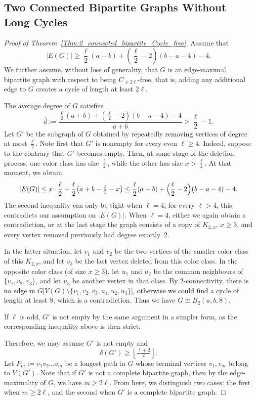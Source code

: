 \documentclass[11pt,a4paper]{article}
\begin{document}
\subsection{Two Connected Bipartite Graphs Without Long Cycles}\label{Sec:Proof}
\begin{proof}[Proof of Theorem~\ref{Thm:2_connected_bipartite_Cycle_free}]
Assume that
\[
|E(G)| \ge \frac{\ell}{2}(a + b) + \left(\frac{\ell}{2} - 2\right)(b - a - 4) - 4.
\]  
We further assume, without loss of generality, that $G$ is an edge-maximal bipartite graph with respect to being $C_{\ge2\ell}$-free, that is, adding any additional edge to $G$ creates a cycle of length at least $2\ell$.

The average degree of $G$ satisfies
\[
\overline{d}
:= \frac{\tfrac{\ell}{2}(a + b)
      + \left(\tfrac{\ell}{2} - 2\right)(b - a - 4) - 4}{a + b}
> \frac{\ell}{2} - 1.
\]
Let $G'$ be the subgraph of $G$ obtained by repeatedly removing vertices
of degree at most $\tfrac{\ell}{2}$.
Note first that $G'$ is nonempty for every even $\ell \ge 4$.
Indeed, suppose to the contrary that $G'$ becomes empty.
Then, at some stage of the deletion process, one color class has size $\tfrac{\ell}{2}$,
while the other has size $x > \tfrac{\ell}{2}$.
At that moment, we obtain
\[
|E(G)|
\le x \cdot \frac{\ell}{2}
   + \frac{\ell}{2}\bigl(a + b - \tfrac{\ell}{2} - x\bigr)
\le \frac{\ell}{2}(a + b)
   + \Bigl(\frac{\ell}{2} - 2\Bigr)(b - a - 4) - 4.
\]
The second inequality can only be tight when $\ell = 4$; for every  $\ell > 4$, this contradicts our assumption on $|E(G)|$.
When $\ell = 4$, either we again obtain a contradiction, or at the last stage the graph consists of a copy of $K_{2,x}$, $x \ge 3$, and every vertex removed previously had degree exactly~$2$.

In the latter situation, let $v_1$ and $v_2$ be the two vertices of the smaller color class of this $K_{2,x}$, and let $v_3$ be the last vertex deleted from this color class.
In the opposite color class (of size $x \ge 3$), let $u_1$ and $u_2$ be the common neighbours of $\{v_1, v_2, v_3\}$, and let $u_3$ be another vertex in that class.
By $2$-connectivity, there is no edge in $G\bigl[V(G)\setminus \{v_1, v_2, v_3, u_1, u_2, u_3\}\bigr]$,
otherwise we could find a cycle of length at least $8$, which is a contradiction. Thus we have $G \cong B_2(a,b,8)$.

If $\ell$ is odd, $G'$ is not empty by the same argument in a simpler form, as the corresponding inequality above is then strict.


Therefore, we may assume $G'$ is not empty and 
\[
\delta(G') \ge \left\lfloor \tfrac{\ell + 2}{2} \right\rfloor .
\]
Let $P_m := v_1v_2 \dots v_m$ be a longest path in $G$ whose terminal vertices $v_1, v_m$ belong to $V(G')$.
Note that if $G'$ is not a complete bipartite graph, then by the edge-maximality of $G$, we have $m \ge 2\ell$.
From here, we distinguish two cases: the first when $m \ge 2\ell$, and the second when $G'$ is a complete bipartite graph.


\end{proof}
\end{document}
